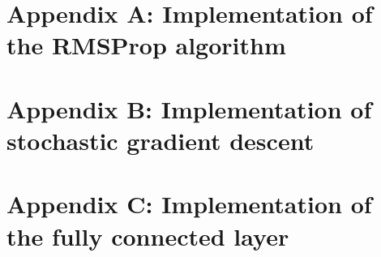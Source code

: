 \documentclass[twoside]{article}
\begin{document}
\section{Appendix A: Implementation of the RMSProp algorithm}
\label{appendix-a}


\section{Appendix B: Implementation of stochastic gradient descent}
\label{appendix-b}


\section{Appendix C: Implementation of the fully connected layer}
\label{appendix-c}


\end{document}

